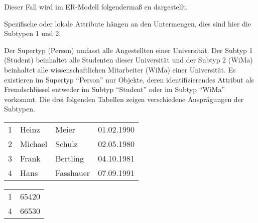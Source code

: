         Dieser Fall wird im ER-Modell folgendermaß en dargestellt.
        \begin{center}
        \end{center}
        \begin{merke}
          Spezifische oder lokale Attribute hängen an den Untermengen, dies sind hier die Subtypen 1 und 2.
        \end{merke}
          Der Supertyp (Person) umfasst alle Angestellten einer Universität.
          Der Subtyp 1 (Student) beinhaltet alle Studenten dieser Universität
          und der Subtyp 2 (WiMa) beinhaltet alle wissenschaftlichen Mitarbeiter
          (WiMa) einer Universität. Es existieren im Supertyp \enquote{Person}
          nur Objekte, deren identifizierendes Attribut als Fremdschlüssel
          entweder im Subtyp \enquote{Student} oder im Subtyp \enquote{WiMa}
          vorkommt. Die drei folgenden Tabellen zeigen verschiedene
          Ausprägungen der Subtypen.
          \begin{supertabular}[h]{llll}
            1 & Heinz & Meier & 01.02.1990 \\
            2 & Michael & Schulz & 02.05.1980 \\
            3 & Frank & Bertling & 04.10.1981 \\
            4 & Hans & Fasshauer & 07.09.1991 \\
          \end{supertabular}

          \begin{supertabular}[h]{lp{5cm}}
            1 & 65420\\
            4 & 66530\\
          \end{supertabular}

